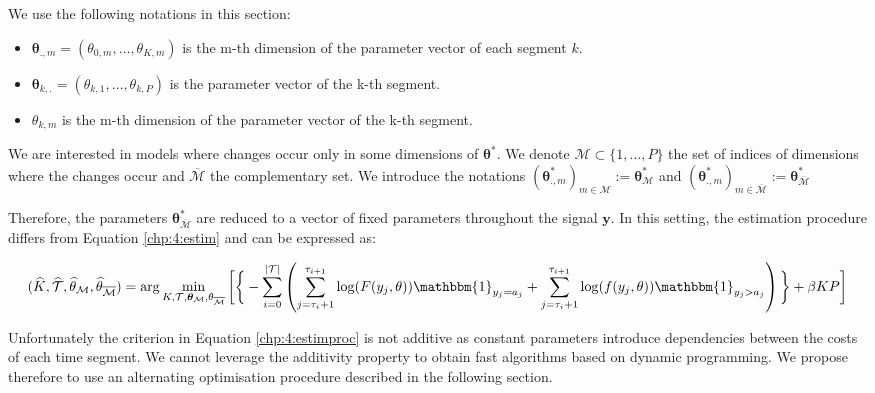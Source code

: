 We use the following notations in this section: 
\begin{itemize}
\item $\bm \theta_{.,m} = (\theta_{0,m},\dots,\theta_{K,m})$ is the m-th dimension of the parameter vector of each segment $k$.
\item $\bm \theta_{k,.} = (\theta_{k,1},\dots,\theta_{k,P})$ is the parameter vector of the k-th segment.
\item $\theta_{k,m}$ is the m-th dimension of the parameter vector of the k-th segment.
\end{itemize}

We are interested in models where changes occur only in some dimensions of $\bm\theta^*$. We denote $\mathcal{M} \subset \{1,\dots,P\}$ the set of indices of dimensions where the changes occur and $\overline{\mathcal{M}}$ the complementary set. We introduce the notations $(\bm\theta^*_{.,m})_{m \in \mathcal{M}} := \bm\theta^*_{\mathcal{M}}$ and $(\bm\theta^*_{.,m})_{m \in \overline{\mathcal{M}}} := \bm\theta^*_{\overline{\mathcal{M}}}$

 Therefore, the parameters $\bm\theta^*_{\overline{\mathcal{M}}}$ are reduced to a vector of fixed parameters throughout the signal $\bm y$. In this setting, the estimation procedure differs from Equation \eqref{chp:4:estim} and can be expressed as: 


\begin{dmath}\label{chp:4:estimproc}
(\widehat{K},\widehat{\TT},\widehat{\theta}_{\mathcal{M}},\widehat{\theta}_{\overline{\mathcal{M}}}) = \arg\min_{K,\TT,\bm \theta_{\mathcal{M}},\theta_{\overline{\mathcal{M}}}}\bigg[\bigg\{ - \sum_{i=0}^{\lvert \TT \rvert}  \left(\sum_{j=\tau_i+1}^{\tau_{i+1}}\log(F(y_j,\theta))\mathbbm{1}_{y_j=a_j}+\sum_{j=\tau_i+1}^{\tau_{i+1}}\log(f(y_j,\theta))\mathbbm{1}_{y_j>a_j}\right)\bigg\}+\beta KP \bigg]
\end{dmath}

Unfortunately the criterion in Equation \eqref{chp:4:estimproc} is not additive as constant parameters introduce dependencies between the costs of each time segment. We cannot leverage the additivity property to obtain fast algorithms based on dynamic programming. We propose therefore to use an alternating optimisation procedure described in the following section. 

